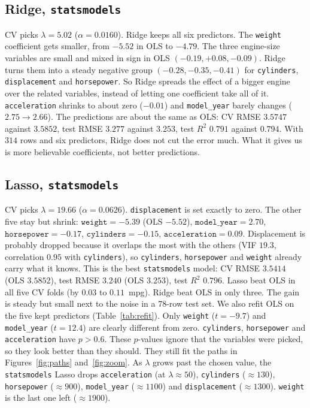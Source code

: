 \documentclass[11pt]{article}
\begin{document}
\subsection{Ridge, \texttt{statsmodels}}\label{sec:ridge-sm}
CV picks $\lambda=5.02$ ($\alpha=0.0160$). Ridge keeps all six predictors. The \texttt{weight} coefficient gets smaller, from
$-5.52$ in OLS to $-4.79$. The three engine-size variables are small and mixed in sign in OLS $(-0.19,+0.08,-0.09)$. Ridge turns
them into a steady negative group $(-0.28,-0.35,-0.41)$ for \texttt{cylinders}, \texttt{displacement} and \texttt{horsepower}. So
Ridge spreads the effect of a bigger engine over the related variables, instead of letting one coefficient take all of it.
\texttt{acceleration} shrinks to about zero ($-0.01$) and \texttt{model\_year} barely changes ($2.75\to2.66$). The predictions are
about the same as OLS: CV RMSE $3.5747$ against $3.5852$, test RMSE $3.277$ against $3.253$, test $R^2$ $0.791$ against
$0.794$. With $314$ rows and six predictors, Ridge does not cut the error much. What it gives us is more believable coefficients, not better predictions.

\subsection{Lasso, \texttt{statsmodels}}\label{sec:lasso-sm}
CV picks $\lambda=19.66$ ($\alpha=0.0626$). \texttt{displacement} is set exactly to zero. The other five stay but shrink:
$\texttt{weight}=-5.39$ (OLS $-5.52$), $\texttt{model\_year}=2.70$, $\texttt{horsepower}=-0.17$,
$\texttt{cylinders}=-0.15$, $\texttt{acceleration}=0.09$. Displacement is probably dropped because it overlaps the most with the
others (VIF $19.3$, correlation $0.95$ with \texttt{cylinders}), so \texttt{cylinders}, \texttt{horsepower} and \texttt{weight}
already carry what it knows. This is the best \texttt{statsmodels} model: CV RMSE $3.5414$ (OLS $3.5852$), test RMSE $3.240$
(OLS $3.253$), test $R^2$ $0.796$. Lasso beat OLS in all five CV folds (by $0.03$ to $0.11$~mpg). Ridge beat OLS in only three. The gain is
steady but small next to the noise in a 78-row test set. We also refit OLS on the five kept predictors (Table~\ref{tab:refit}).
Only \texttt{weight} ($t=-9.7$) and \texttt{model\_year} ($t=12.4$) are clearly different from zero. \texttt{cylinders},
\texttt{horsepower} and \texttt{acceleration} have $p>0.6$. These $p$-values ignore that the variables were picked, so they look
better than they should. They still fit the paths in Figures~\ref{fig:paths} and~\ref{fig:zoom}. As $\lambda$ grows past the chosen
value, the \texttt{statsmodels} Lasso drops \texttt{acceleration} (at $\lambda\approx50$), \texttt{cylinders} ($\approx130$),
\texttt{horsepower} ($\approx900$), \texttt{model\_year} ($\approx1100$) and \texttt{displacement} ($\approx1300$). \texttt{weight}
is the last one left ($\approx1900$).
\end{document}
